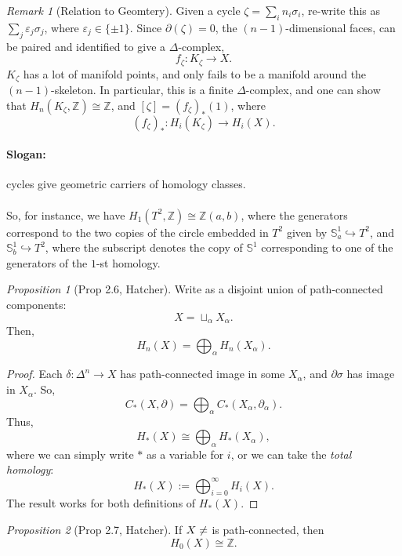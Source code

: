 \documentclass[a4paper]{report}
\theoremstyle{definition}
\theoremstyle{remark}
\newtheorem{remark}{Remark}
\theoremstyle{proposition}
\newtheorem{proposition}{Proposition}
\theoremstyle{conjecture}
\theoremstyle{lemma}
\theoremstyle{corollary}
\theoremstyle{exercise}
\begin{document}
\begin{remark}[Relation to Geomtery]
    Given a cycle $\zeta = \sum_i n_i \sigma_i$, 
    re-write this as $\sum_j \varepsilon_j \sigma_j$, where $\varepsilon_j \in \lbrace \pm 1\rbrace$.
    Since $\partial(\zeta) = 0$, the $(n-1)$-dimensional faces, can be paired and identified 
    to give a $\Delta$-complex, 
    $$f_\zeta : K_\zeta \longrightarrow X.$$
    $K_\zeta$ has a lot of manifold points, and only fails to be a manifold around the $(n-1)$-skeleton.
    In particular, this is a finite $\Delta$-complex, and one can show that $H_n(K_\zeta,\mathbb{Z}) \cong \mathbb{Z}$,
    and $[\zeta] = (f_\zeta)_\ast (1)$, where
    $$(f_\zeta)_\ast : H_i(K_\zeta) \longrightarrow H_i(X).$$
\end{remark}

\paragraph{Slogan:} cycles give geometric carriers of homology classes. \\\\
So, for instance, we have $H_1(T^2,\mathbb{Z}) \cong \mathbb{Z}(a,b)$, 
where the generators correspond to the two copies of the circle embedded in $T^2$ 
given by $\mathbb{S}^1_a \hookrightarrow T^2$, and $\mathbb{S}^1_b \hookrightarrow T^2$,
where the subscript denotes the copy of $\mathbb{S}^1$ corresponding to one of the generators 
of the $1$-st homology.

\begin{proposition}[Prop 2.6, Hatcher]
    Write as a disjoint union of path-connected components:
    $$X = \sqcup_\alpha X_\alpha.$$
    Then, 
    $$H_n(X) = \bigoplus_\alpha H_n(X_\alpha).$$
\end{proposition}

\begin{proof}
    Each $\delta : \Delta^n \to X$ has path-connected image in some $X_\alpha$, and 
    $\partial\sigma$ has image in $X_\alpha$.
    So, $$C_\ast(X,\partial) = \bigoplus_\alpha C_\ast(X_\alpha,\partial_\alpha).$$
    Thus, 
    $$H_\ast(X) \cong \bigoplus_\alpha H_\ast(X_\alpha),$$
    where we can simply write $\ast$ as a variable for $i$, or we can take the 
    \emph{total homology}: 
    $$H_\ast(X) := \bigoplus_{i=0}^\infty H_i(X).$$
    The result works for both definitions of $H_\ast(X)$.
\end{proof}

\begin{proposition}[Prop 2.7, Hatcher]
    If $X \neq \empty$ is path-connected, then $$H_0(X) \cong \mathbb{Z}.$$
\end{proposition}
\end{document}
